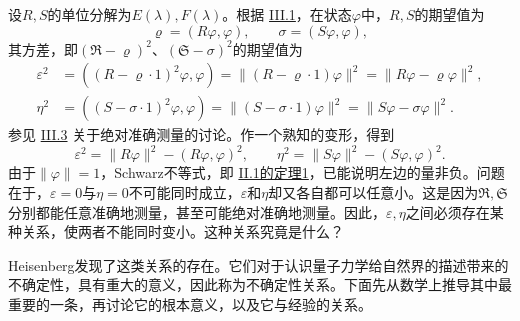 \documentclass[fontsize=13pt,twoside,openany,headings=normal,parskip=false,bookmarkpackage=false,DIV=calc]{scrbook}
\begin{document}
设$R,\allowbreak S$的单位分解为$E(\lambda),\allowbreak F(\lambda)$。根据 \hyperref[sec:III.1]{III.1}，在状态$\varphi$中，$R,\allowbreak S$的期望值为
\[
\varrho=(R\varphi,\varphi),\qquad\sigma=(S\varphi,\varphi),
\]
其方差，即$(\mathfrak R-\varrho)^2$、$(\mathfrak S-\sigma)^2$的期望值为
\begin{align*}
\varepsilon^2&=((R-\varrho\cdot1)^2\varphi,\varphi)
=\|(R-\varrho\cdot1)\varphi\|^2=\|R\varphi-\varrho\varphi\|^2,\\
\eta^2&=((S-\sigma\cdot1)^2\varphi,\varphi)
=\|(S-\sigma\cdot1)\varphi\|^2=\|S\varphi-\sigma\varphi\|^2.
\end{align*}
参见 \hyperref[sec:III.3]{III.3} 关于绝对准确测量的讨论。作一个熟知的变形，得到
\[
\varepsilon^2=\|R\varphi\|^2-(R\varphi,\varphi)^2,\qquad
\eta^2=\|S\varphi\|^2-(S\varphi,\varphi)^2.
\]
由于$\|\varphi\|=1$，Schwarz不等式，即 \hyperref[thm:II.1]{II.1的定理1}，已能说明左边的量非负。问题在于，$\varepsilon=0$与$\eta=0$不可能同时成立，$\varepsilon$和$\eta$却又各自都可以任意小。\hypertarget{origpage-123}{}\label{origpage-123}这是因为$\mathfrak R,\allowbreak \mathfrak S$分别都能任意准确地测量，甚至可能绝对准确地测量。因此，$\varepsilon,\allowbreak \eta$之间必须存在某种关系，使两者不能同时变小。这种关系究竟是什么？

Heisenberg发现了这类关系的存在。它们对于认识量子力学给自然界的描述带来的不确定性，具有重大的意义，因此称为不确定性关系。下面先从数学上推导其中最重要的一条，再讨论它的根本意义，以及它与经验的关系。
\end{document}
